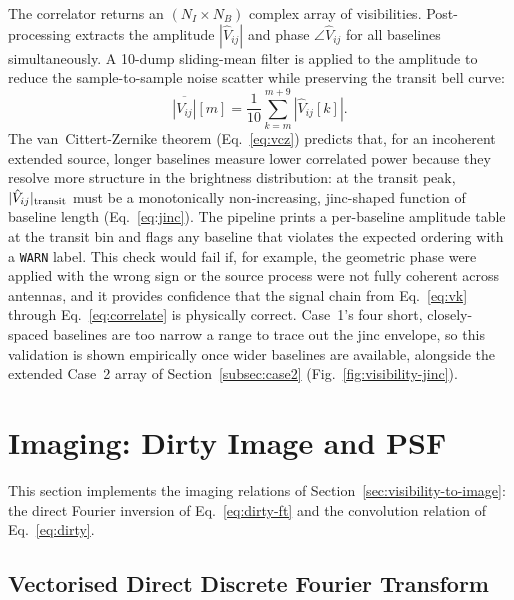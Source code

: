 The correlator returns an $(N_I \times N_B)$ complex array of visibilities.
Post-processing extracts the amplitude $|{\hat V}_{ij}|$ and phase
$\angle\hat{V}_{ij}$ for all baselines simultaneously. A 10-dump sliding-mean
filter is applied to the amplitude to reduce the sample-to-sample noise scatter
while preserving the transit bell curve:
\begin{equation}
  \overline{|V_{ij}|}[m] = \frac{1}{10}\sum_{k=m}^{m+9}|\hat{V}_{ij}[k]|.
\end{equation}
The van~Cittert-Zernike theorem (Eq.~\eqref{eq:vcz}) predicts that, for an
incoherent extended source, longer baselines measure lower correlated power
because they resolve more structure in the brightness distribution: at the
transit peak, $|\hat{V}_{ij}|_{\rm transit}$ must be a monotonically
non-increasing, jinc-shaped function of baseline length
(Eq.~\eqref{eq:jinc}). The pipeline prints a per-baseline amplitude table at
the transit bin and flags any baseline that violates the expected ordering
with a \texttt{WARN} label. This check would fail if, for example, the
geometric phase were applied with the wrong sign or the source process were
not fully coherent across antennas, and it provides confidence that the
signal chain from Eq.~\eqref{eq:vk} through Eq.~\eqref{eq:correlate} is
physically correct. Case~1's four short, closely-spaced baselines are too
narrow a range to trace out the jinc envelope, so this validation is shown
empirically once wider baselines are available, alongside the extended
Case~2 array of Section~\ref{subsec:case2} (Fig.~\ref{fig:visibility-jinc}).

\section{Imaging: Dirty Image and PSF}
\label{sec:imaging}

This section implements the imaging relations of
Section~\ref{sec:visibility-to-image}: the direct Fourier inversion of
Eq.~\eqref{eq:dirty-ft} and the convolution relation of Eq.~\eqref{eq:dirty}.

\subsection{Vectorised Direct Discrete Fourier Transform}
\label{subsec:dft-imaging}

